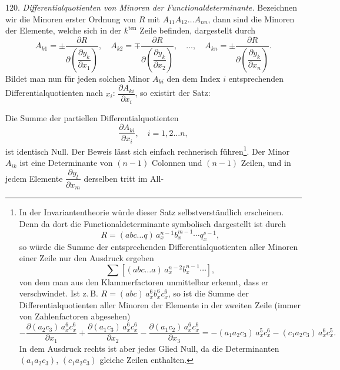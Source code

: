 120. \textit{Differentialquotienten von Minoren der Functionaldeterminante.} Bezeichnen wir die Minoren erster Ordnung von $R$ mit $A_{11} A_{12} \ldots A_{nn}$, dann sind die Minoren der Elemente, welche sich in der $k^{\mathrm{ten}}$ Zeile befinden, dargestellt durch
\[
A_{k1} = \pm \dfrac{\partial R}{\partial\left(\dfrac{\partial y_k}{\partial x_1}\right)}, \quad
A_{k2} = \mp \dfrac{\partial R}{\partial\left(\dfrac{\partial y_k}{\partial x_2}\right)}, \quad \ldots, \quad
A_{kn} = \pm \dfrac{\partial R}{\partial\left(\dfrac{\partial y_k}{\partial x_n}\right)}.
\]
Bildet man nun für jeden solchen Minor $A_{ki}$ den dem Index $i$ entsprechenden Differentialquotienten nach $x_i$: $\dfrac{\partial A_{ki}}{\partial x_i}$, so existirt der Satz:

\glqq Die Summe der partiellen Differentialquotienten
\[
\frac{\partial A_{ki}}{\partial x_i}, \quad i = 1, 2 \ldots n,
\]
ist identisch Null.\grqq{} Der Beweis lässt sich einfach rechnerisch führen\footnote{In der Invariantentheorie würde dieser Satz selbstverständlich erscheinen. Denn da dort die Functionaldeterminante symbolisch dargestellt ist durch
\[
R = (abc \ldots q)\, a_x^{n-1} b_x^{m-1} \cdots q_x^{s-1},
\]
so würde die Summe der entsprechenden Differentialquotienten aller Minoren einer Zeile nur den Ausdruck ergeben
\[
\sum \left[ (abc \ldots a)\, a_x^{n-2} b_x^{n-1} \cdots \right],
\]
von dem man aus den Klammerfactoren unmittelbar erkennt, dass er verschwindet. Ist z.\,B. $R = (abc)\, a_x^6 b_x^6 c_x^6$, so ist die Summe der Differentialquotienten aller Minoren der Elemente in der zweiten Zeile (immer von Zahlenfactoren abgesehen)
\[
- \frac{\partial(a_2 c_3)\, a_x^6 c_x^6}{\partial x_1} + \frac{\partial(a_1 c_3)\, a_x^6 c_x^6}{\partial x_2} - \frac{\partial(a_1 c_2)\, a_x^6 c_x^6}{\partial x_3}
= -(a_1 a_2 c_3)\, a_x^5 c_x^6 - (c_1 a_2 c_3)\, a_x^6 c_x^5.
\]
In dem Ausdruck rechts ist aber jedes Glied Null, da die Determinanten $(a_1 a_2 c_3)$, $(c_1 a_2 c_3)$ gleiche Zeilen enthalten.}. Der Minor $A_{ik}$ ist eine Determinante von $(n-1)$ Colonnen und $(n-1)$ Zeilen, und in jedem Elemente $\dfrac{\partial y_l}{\partial x_m}$ derselben tritt im All-



